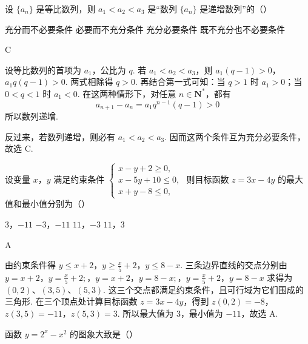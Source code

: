 \begin{problem}
设 \(\{a_{n}\}\) 是等比数列，则 \(a_{1} < a_{2} < a_{3}\) 是“数列 \(\{a_{n}\}\) 是递增数列”的（\quad）

\choices
    {充分而不必要条件}
    {必要而不充分条件}
    {充分必要条件}
    {既不充分也不必要条件}
\end{problem}

\begin{answer}
C
\end{answer}

\begin{solution}
设等比数列的首项为 \(a_1\)，公比为 \(q\). 若 \(a_1<a_2<a_3\)，则
\(a_1(q-1)>0\)，\(a_1q(q-1)>0\).
两式相除得 \(q>0\). 再结合第一式可知：当 \(q>1\) 时 \(a_1>0\)；当 \(0<q<1\) 时 \(a_1<0\). 在这两种情形下，对任意 \(n\in\mathbf N^*\)，都有
\[
a_{n+1}-a_n=a_1q^{n-1}(q-1)>0
\]
所以数列递增.

反过来，若数列递增，则必有 \(a_1<a_2<a_3\). 因而这两个条件互为充分必要条件，故选 C.
\end{solution}

\begin{problem}
设变量 \(x\)，\(y\) 满足约束条件 \(\begin{cases}
x - y + 2 \geqslant 0,\\
x - 5y + 10 \leqslant 0,\\
x + y - 8 \leqslant 0,
\end{cases}\) 则目标函数 \(z = 3x - 4y\) 的最大值和最小值分别为（\quad）

\choices
    {\(3\)，\(-11\)}
    {\(-3\)，\(-11\)}
    {\(11\)，\(-3\)}
    {\(11\)，\(3\)}
\end{problem}

\begin{answer}
A
\end{answer}

\begin{solution}
由约束条件得
\(y\leqslant x+2\)，\(y\geqslant\frac{x}{5}+2\)，\(y\leqslant8-x\).
三条边界直线的交点分别由
\(y=x+2\)，\(y=\frac{x}{5}+2;\)，\(y=x+2\)，\(y=8-x;\)，\(y=\frac{x}{5}+2\)，\(y=8-x\)
求得为 \((0,2)\)、\((3,5)\)、\((5,3)\). 这三个交点都满足约束条件，且可行域为它们围成的三角形. 在三个顶点处计算目标函数 \(z=3x-4y\)，得到
\(z(0,2)=-8\)，\(z(3,5)=-11\)，\(z(5,3)=3\).
所以最大值为 \(3\)，最小值为 \(-11\)，故选 A.
\end{solution}

\begin{problem}
函数 \( y = 2^{x} - x^{2} \) 的图象大致是（\quad）

    {}
    {}
    {}
\end{problem}

